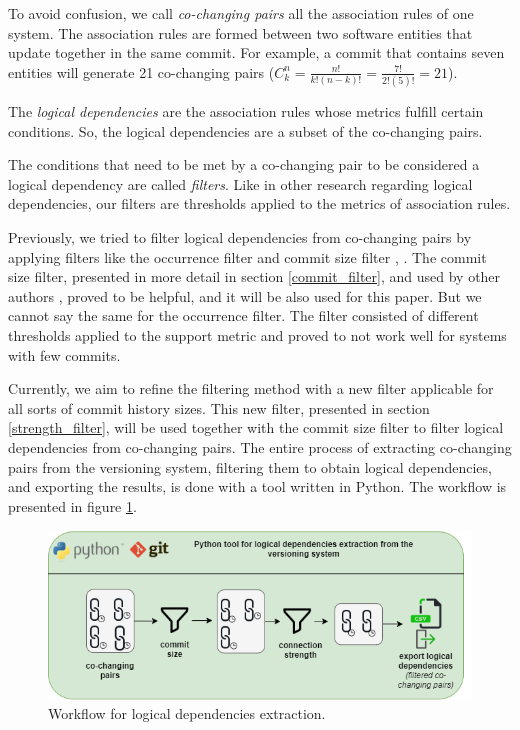 \documentclass[runningheads]{comsis2}
\newcommand*{\Comb}[2]{{}C^{#1}_{#2}}%
\begin{document}
To avoid confusion, we call \textit{co-changing pairs} all the association rules of one system. The association rules are formed between two software entities that update together in the same commit.
For example, a commit that contains seven entities will generate 21 co-changing pairs ($\Comb{n}{k}=\frac{n!}{k!(n-k)!} = \frac{7!}{2!(5)!} = 21$).


The \textit{logical dependencies} are the association rules whose metrics fulfill certain conditions. So, the logical dependencies are a subset of the co-changing pairs. 

The conditions that need to be met by a co-changing pair to be considered a logical dependency are called \textit{filters}. Like in other research regarding logical dependencies, our filters are thresholds applied to the metrics of association rules. 

Previously, we tried to filter logical dependencies from co-changing pairs by applying filters like the occurrence filter and commit size filter \cite{saci19}, \cite{enase19}. 
The commit size filter, presented in more detail in section \ref{commit_filter}, and used by other authors \cite{DBLP:journals/jss/AjienkaC17}, proved to be helpful, and it will be also used for this paper. 
But we cannot say the same for the occurrence filter. The filter consisted of different thresholds applied to the support metric and proved to not work well for systems with few commits.

Currently, we aim to refine the filtering method with a new filter applicable for all sorts of commit history sizes. This new filter, presented in section \ref{strength_filter}, will be used together with the commit size filter to filter logical dependencies from co-changing pairs. The entire process of extracting co-changing pairs from the versioning system, filtering them to obtain logical dependencies, and exporting the results, is done with a tool written in Python. The workflow is presented in figure \ref{fig:workflow_key}.

\begin{figure}
\centering
\includegraphics[scale=0.6]{ld_workflow.png}
\caption{Workflow for logical dependencies extraction.}
\label{fig:workflow_key}
\centering
\end{figure}
\vspace{-2em}
\end{document}
